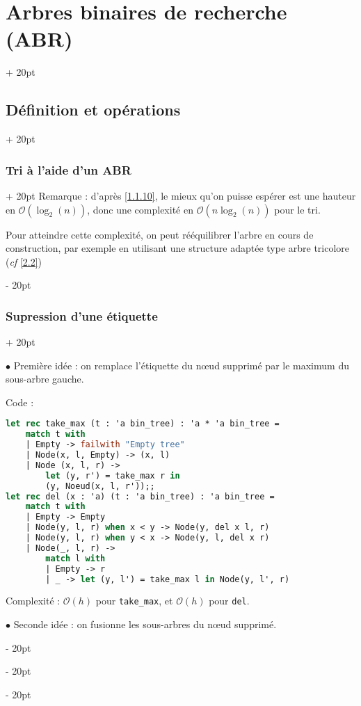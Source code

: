 \documentclass[a4paper, 12pt, twoside]{article}
\newcommand{\ind}[1][20pt]{\advance\leftskip + #1}
\newcommand{\deind}[1][20pt]{\advance\leftskip - #1}
\newenvironment{indt}[2][20pt]{#2 \par \ind[#1]}{\par \deind} %
\begin{document}
\begin{indt}{\section{Arbres binaires de recherche (ABR)}}
\begin{indt}{\subsection{Définition et opérations}}
\begin{indt}{\subsubsection{Tri à l'aide d'un ABR}}
                Remarque : d'après \ref{1.1.10}, le mieux qu'on puisse espérer est une hauteur en $\mathcal O(\log_2(n))$, donc une complexité en $\mathcal O(n\log_2(n))$ pour le tri.
                
                Pour atteindre cette complexité, on peut rééquilibrer l'arbre en cours de construction, par exemple en utilisant une structure adaptée type arbre tricolore (\textit{cf} \ref{2.2})
            \end{indt}
            
            \vspace{12pt}
            
            \begin{indt}{\subsubsection{Supression d'une étiquette}}
                \label{2.1.10}
                
                $\bullet$ Première idée : on remplace l'étiquette du n\oe ud supprimé par le maximum du sous-arbre gauche.
                
                Code :
                
                \begin{lstlisting}[language=Caml, xleftmargin=80pt]
let rec take_max (t : 'a bin_tree) : 'a * 'a bin_tree =
    match t with
    | Empty -> failwith "Empty tree"
    | Node(x, l, Empty) -> (x, l)
    | Node (x, l, r) ->
        let (y, r') = take_max r in
        (y, Noeud(x, l, r'));;
let rec del (x : 'a) (t : 'a bin_tree) : 'a bin_tree =
    match t with
    | Empty -> Empty
    | Node(y, l, r) when x < y -> Node(y, del x l, r)
    | Node(y, l, r) when y < x -> Node(y, l, del x r)
    | Node(_, l, r) ->
        match l with
        | Empty -> r
        | _ -> let (y, l') = take_max l in Node(y, l', r)\end{lstlisting}
                
                Complexité : $\mathcal O(h)$ pour \texttt{take\_max}, et $\mathcal O(h)$ pour \texttt{del}.
                
                \vspace{12pt}
                
                $\bullet$ Seconde idée : on fusionne les sous-arbres du n\oe ud supprimé.
                

\end{indt}
\end{indt}
\end{indt}
\end{document}
